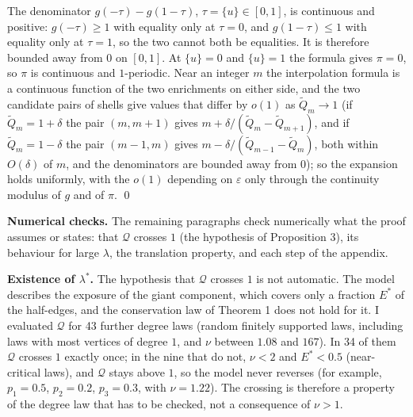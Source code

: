 \documentclass{nws}
\begin{document}
The denominator $g(-\tau)-g(1-\tau)$, $\tau=\{u\}\in[0,1]$, is continuous and positive: $g(-\tau)\ge1$ with equality only at $\tau=0$, and $g(1-\tau)\le1$ with equality only at $\tau=1$, so the two cannot both be equalities. It is therefore bounded away from $0$ on $[0,1]$. At $\{u\}=0$ and $\{u\}=1$ the formula gives $\pi=0$, so
$\pi$ is continuous and $1$-periodic. Near an integer $m$ the interpolation formula is a continuous function of the
two enrichments on either side, and the two candidate pairs of shells give values that differ by $o(1)$ as
$\tilde Q_m\to1$ (if $\tilde Q_m=1+\delta$ the pair $(m,m+1)$ gives $m+\delta/(\tilde Q_m-\tilde Q_{m+1})$, and if
$\tilde Q_m=1-\delta$ the pair $(m-1,m)$ gives $m-\delta/(\tilde Q_{m-1}-\tilde Q_m)$, both within $O(\delta)$ of $m$, and
the denominators are bounded away from $0$); so the expansion holds uniformly, with the $o(1)$ depending on $\varepsilon$ only
through the continuity modulus of $g$ and of $\pi$. \qed

\textbf{Numerical checks.} The remaining paragraphs check numerically what the proof assumes or states: that $\mathcal Q$ crosses $1$ (the hypothesis of Proposition 3), its behaviour for large $\lambda$, the translation property, and each step of the appendix.

\textbf{Existence of $\lambda^*$.} The hypothesis that $\mathcal Q$ crosses $1$ is not automatic. The model describes the exposure of the giant component, which covers only a fraction $E^*$ of the half-edges, and the conservation law of Theorem 1 does not hold for it. I evaluated $\mathcal Q$ for 43 further degree laws (random finitely supported laws, including laws with most vertices of degree $1$, and $\nu$ between $1.08$ and $167$). In 34 of them $\mathcal Q$ crosses $1$ exactly once; in the nine that do not, $\nu<2$ and $E^*<0.5$ (near-critical laws), and $\mathcal Q$ stays above $1$, so the model never reverses (for example, $p_1=0.5$, $p_2=0.2$, $p_3=0.3$, with $\nu=1.22$). The crossing is therefore a property of the degree law that has to be checked, not a consequence of $\nu>1$.
\end{document}
